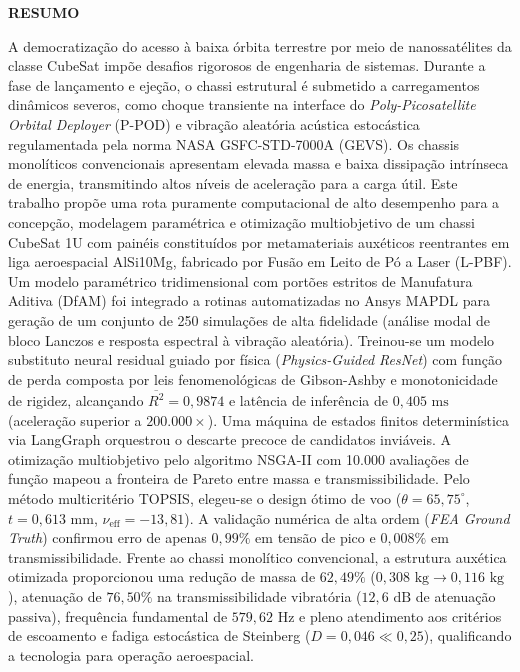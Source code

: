 \documentclass[12pt,a4paper]{report}
\begin{document}
\clearpage
\begin{center}
    {\textbf{\Large RESUMO}}
\end{center}
\vspace{0.5cm}

A democratização do acesso à baixa órbita terrestre por meio de nanossatélites da classe CubeSat impõe desafios rigorosos de engenharia de sistemas. Durante a fase de lançamento e ejeção, o chassi estrutural é submetido a carregamentos dinâmicos severos, como choque transiente na interface do \textit{Poly-Picosatellite Orbital Deployer} (P-POD) e vibração aleatória acústica estocástica regulamentada pela norma NASA GSFC-STD-7000A (GEVS). Os chassis monolíticos convencionais apresentam elevada massa e baixa dissipação intrínseca de energia, transmitindo altos níveis de aceleração para a carga útil. Este trabalho propõe uma rota puramente computacional de alto desempenho para a concepção, modelagem paramétrica e otimização multiobjetivo de um chassi CubeSat 1U com painéis constituídos por metamateriais auxéticos reentrantes em liga aeroespacial AlSi10Mg, fabricado por Fusão em Leito de Pó a Laser (L-PBF). Um modelo paramétrico tridimensional com portões estritos de Manufatura Aditiva (DfAM) foi integrado a rotinas automatizadas no Ansys MAPDL para geração de um conjunto de 250 simulações de alta fidelidade (análise modal de bloco Lanczos e resposta espectral à vibração aleatória). Treinou-se um modelo substituto neural residual guiado por física (\textit{Physics-Guided ResNet}) com função de perda composta por leis fenomenológicas de Gibson-Ashby e monotonicidade de rigidez, alcançando $\overline{R^2} = 0{,}9874$ e latência de inferência de $0{,}405\text{ ms}$ (aceleração superior a $200.000\times$). Uma máquina de estados finitos determinística via LangGraph orquestrou o descarte precoce de candidatos inviáveis. A otimização multiobjetivo pelo algoritmo NSGA-II com 10.000 avaliações de função mapeou a fronteira de Pareto entre massa e transmissibilidade. Pelo método multicritério TOPSIS, elegeu-se o design ótimo de voo ($\theta = 65{,}75^\circ$, $t = 0{,}613\text{ mm}$, $\nu_{\text{eff}} = -13{,}81$). A validação numérica de alta ordem (\textit{FEA Ground Truth}) confirmou erro de apenas $0{,}99\%$ em tensão de pico e $0{,}008\%$ em transmissibilidade. Frente ao chassi monolítico convencional, a estrutura auxética otimizada proporcionou uma redução de massa de $62{,}49\%$ ($0{,}308\text{ kg} \to 0{,}116\text{ kg}$), atenuação de $76{,}50\%$ na transmissibilidade vibratória ($12{,}6\text{ dB}$ de atenuação passiva), frequência fundamental de $579{,}62\text{ Hz}$ e pleno atendimento aos critérios de escoamento e fadiga estocástica de Steinberg ($D = 0{,}046 \ll 0{,}25$), qualificando a tecnologia para operação aeroespacial.
\end{document}
